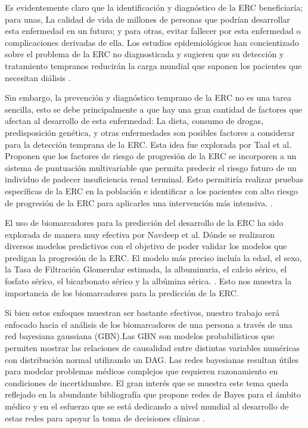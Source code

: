 \documentclass{Academic}
\begin{document}
Es evidentemente claro que la identificación y diagnóstico de la ERC beneficiaría; para unas, 
La calidad de vida de millones de personas que podrían desarrollar esta enfermedad en un 
futuro; y para otras, evitar fallecer por esta enfermedad o complicaciones derivadas de ella. 
Los estudios epidemiológicos han concientizado sobre el problema de la ERC no 
diagnosticada y sugieren que su detección y tratamiento tempranos reducirán
la carga mundial que suponen los pacientes que necesitan diálisis \cite{Taal}.

Sin embargo, la prevención y diagnóstico temprano de la ERC no es una tarea sencilla, 
esto se debe principalmente a que hay una gran cantidad de factores que afectan al 
desarrollo de esta enfermedad: La dieta, consumo de drogas, predisposición genética, 
y otras enfermedades son posibles factores a considerar para la detección temprana de la 
ERC. Esta idea fue explorada por Taal et al. Proponen que los factores de riesgo de progresión de la ERC se
incorporen a un sistema de puntuación multivariable que permita
predecir el riesgo futuro de un individuo de padecer insuficiencia renal terminal. Esto permitiría
realizar pruebas específicas de la ERC en la población e identificar a
los pacientes con alto riesgo de progresión de la ERC para aplicarles una
intervención más intensiva. \cite{Taal}.

El uso de biomarcadores para la predicción del desarrollo de la ERC ha sido explorada
de manera muy efectiva por Navdeep et al. Dónde se realizaron diversos modelos predictivos con el 
objetivo de poder validar los modelos que predigan la progresión de la ERC. El modelo 
más preciso incluía la edad, el sexo, la Tasa de Filtración Glomerular estimada, la albuminuria, 
el calcio sérico, el fosfato sérico, el bicarbonato sérico y la albúmina sérica. \cite{Navdeep}.
Esto nos muestra la importancia de los biomarcadores para la predicción de la ERC.

Si bien estos enfoques muestran ser bastante efectivos, nuestro trabajo será enfocado hacia el análisis 
de los biomarcadores de una persona a través de una red bayesiana gaussiana (GBN).Las GBN son modelos 
probabilísticos que permiten mostrar las relaciones de causalidad entre distintas
variables numéricas con distribución normal utilizando un DAG. Las redes bayesianas resultan útiles para modelar 
problemas médicos complejos que requieren razonamiento en condiciones de incertidumbre. El gran interés 
que se muestra este tema queda reflejado en la abundante bibliografía que propone redes de Bayes para el 
ámbito médico y en el esfuerzo que se está dedicando a nivel mundial al desarrollo de estas redes para apoyar 
la toma de decisiones clínicas \cite{Kyrimi}. 
\end{document}
